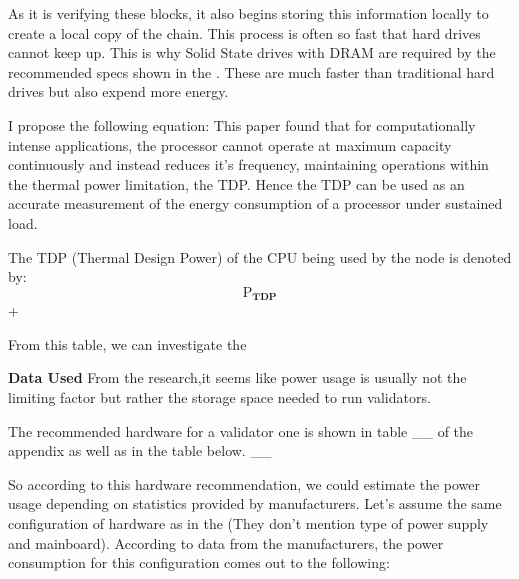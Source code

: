  As it is verifying these blocks, it also begins storing this information locally to create a local copy of the chain. This process is often so fast that hard drives cannot keep up. This is why Solid State drives with DRAM are required by the recommended specs shown in the . These are much faster than traditional hard drives but also expend more energy.

 I propose the following equation:
This paper \cite{Schuchart2016TheScale} found that for computationally intense applications, the processor cannot operate at maximum capacity continuously and instead reduces it's frequency, maintaining operations within the thermal power limitation, the TDP. Hence the TDP can be used as an accurate measurement of the energy consumption of a processor under sustained load.

The TDP (Thermal Design Power) of the CPU being used by the node is denoted by:
\begin{equation*}
    \boldsymbol{\mathrm{P}_{TDP}}
\end{equation*}+


From this table, we can investigate the 





\textbf{Data Used}
From the research,it seems like power usage is usually not the limiting factor but rather the storage space needed to run validators.

The recommended hardware for a validator one is shown in table \_\_ of the appendix as well as in the table below. \_\_

So according to this hardware recommendation, we could estimate the power usage depending on statistics provided by manufacturers. Let's assume the same configuration of hardware as in the \cite{CCRI:Network} (They don't mention type of power supply and mainboard).  According to data from the manufacturers, the power consumption for this configuration comes out to the following: 

